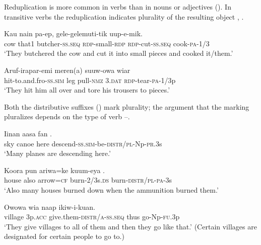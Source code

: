 Reduplication is more common in verbs than in nouns or adjectives (). In transitive verbs the reduplication indicates plurality of the resulting object , . 

\ea%
\label{ex:6:x1298}
\gll Kau  nain  pa-ep,  gele-gelemuti-tik \textstyleEmphasizedVernacularWords{-}  uup-e-mik.\\
cow  that1  butcher-\textsc{ss}.\textsc{seq}  \textsc{rdp}-small-\textsc{rdp} \textsc{rdp}-cut-\textsc{ss}.\textsc{seq}  cook-\textsc{pa}-1/3\\
\glt `They butchered the cow and cut it into small pieces and cooked it/them.'
\z

\ea%
\label{ex:6:x1297}
\gll Aruf-irapar-emi  meren(a)  suuw-owa  wiar \\
hit-to.and.fro-\textsc{ss}.\textsc{sim}  leg  pull-\textsc{nmz}  3.\textsc{dat} \textsc{rdp}-tear-\textsc{pa}-1/3p\\
\glt `They hit him all over and tore his trousers to pieces.'
\z

Both the distributive suffixes () mark plurality; the argument that the marking pluralizes depends on the type of verb --. 

\ea%
\label{ex:6:x1300}
\gll Iinan  aasa  fan  . \\
sky  canoe  here  descend-\textsc{ss}.\textsc{sim}-be-\textsc{distr}/\textsc{pl}-Np-\textsc{pr}.3s\\
\glt `Many planes are descending here.'
\z

\ea%
\label{ex:6:x1299}
\gll Koora  pun  ariwa=ke  kuum-eya  . \\
house  also  arrow=\textsc{cf}  burn-2/3s.\textsc{ds}  burn-\textsc{distr}/\textsc{pl}-\textsc{pa}-3s\\
\glt `Also many houses burned down when the ammunition burned them.'
\z

\ea%
\label{ex:6:x1301}
\gll Owowa  wia    naap  ikiw-i-kuan. \\
village  3p.\textsc{acc}  give.them-\textsc{distr}/\textsc{a}-\textsc{ss}.\textsc{seq}  thus  go-Np-\textsc{fu}.3p\\
\glt `They give villages to all of them and then they go like that.' (Certain villages are designated for certain people to go to.)
\z

